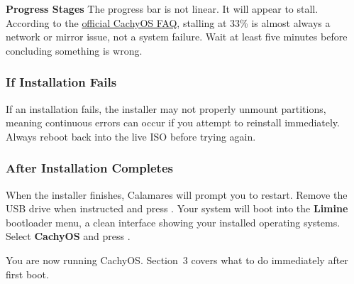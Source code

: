 \documentclass{article}
\begin{document}
\begin{callout}{\textbf{Progress Stages}}
  The progress bar is not linear. It will appear to stall. According to the \href{https://wiki.cachyos.org/cachyos_basic/faq/}{official CachyOS FAQ}, stalling
  at 33\% is almost always a network or mirror issue, not a system failure. Wait at
  least five minutes before concluding something is wrong.
\end{callout}

\subsubsection*{If Installation Fails}

If an installation fails, the installer may not properly unmount partitions, meaning continuous errors can occur if you attempt to reinstall
immediately. Always reboot back into the live ISO before trying again.

\subsubsection*{After Installation Completes}

When the installer finishes, Calamares will prompt you to restart. Remove the USB
drive when instructed and press \keys{\return}. Your system will boot into the
\textbf{Limine} bootloader menu, a clean interface showing your installed operating
systems. Select \textbf{CachyOS} and press \keys{\return}.

\noindent You are now running CachyOS. Section~3 covers what to do immediately
after first boot.
\end{document}
